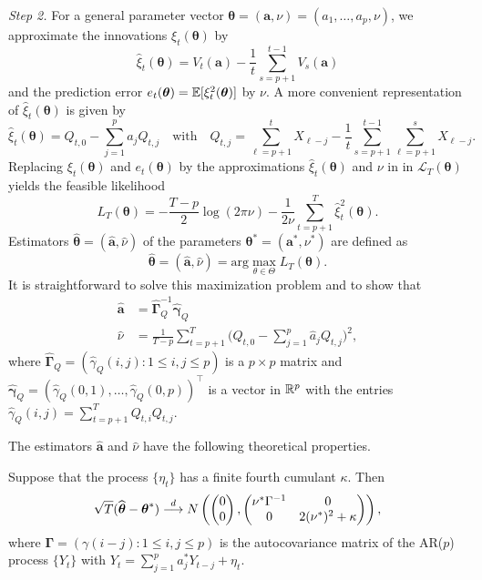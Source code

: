 \documentclass[a4paper,12pt]{article}
\begin{document}
\textit{Step 2.} For a general parameter vector $\boldsymbol{\theta} = (\boldsymbol{a},\nu) = (a_1,\ldots,a_p,\nu)$, we approximate the innovations $\xi_t(\boldsymbol{\theta})$ by 
\[ \widehat{\xi}_t(\boldsymbol{\theta}) = V_t(\boldsymbol{a}) - \frac{1}{t} \sum\limits_{s=p+1}^{t-1} V_s(\boldsymbol{a}) \]
and the prediction error $e_t(\boldsymbol{\theta}) = \mathbb{E}[ \xi_t^2(\boldsymbol{\theta})]$ by $\nu$. A more convenient representation of $\widehat{\xi}_t(\boldsymbol{\theta})$ is given by 
\[ \widehat{\xi}_t(\boldsymbol{\theta}) = Q_{t,0} - \sum\limits_{j=1}^p a_j Q_{t,j} \quad \text{with} \quad Q_{t,j} = \sum\limits_{\ell=p+1}^t X_{\ell-j} - \frac{1}{t} \sum\limits_{s=p+1}^{t-1} \sum\limits_{\ell=p+1}^s X_{\ell-j}. \]
Replacing $\xi_t(\boldsymbol{\theta})$ and $e_t(\boldsymbol{\theta})$ by the approximations $ \widehat{\xi}_t(\boldsymbol{\theta})$ and $\nu$ in in $\mathcal{L}_T(\boldsymbol{\theta})$ yields the feasible likelihood 
\[ L_T(\boldsymbol{\theta}) =  -\frac{T-p}{2} \log(2 \pi \nu) - \frac{1}{2 \nu} \sum\limits_{t=p+1}^T \widehat{\xi}_t^2(\boldsymbol{\theta}). \]
Estimators $\widehat{\boldsymbol{\theta}} = (\widehat{\boldsymbol{a}},\widehat{\nu})$ of the parameters $\boldsymbol{\theta}^* = (\boldsymbol{a}^*,\nu^*)$ are defined as
\[ \widehat{\boldsymbol{\theta}} = (\widehat{\boldsymbol{a}},\widehat{\nu}) = \text{arg} \max_{\theta \in \Theta} L_T(\boldsymbol{\theta}). \] 
It is straightforward to solve this maximization problem and to show that
\begin{align*}
\widehat{\boldsymbol{a}} & = \widehat{\boldsymbol{\Gamma}}_Q^{-1} \widehat{\boldsymbol{\gamma}}_Q \\
\widehat{\nu} & = \frac{1}{T-p} \sum\limits_{t=p+1}^T \Big( Q_{t,0} - \sum\limits_{j=1}^p \widehat{a}_j Q_{t,j} \Big)^2,
\end{align*}
where $\widehat{\boldsymbol{\Gamma}}_Q = (\widehat{\gamma}_Q(i,j): 1 \le i,j \le p)$ is a $p \times p$ matrix and $\widehat{\boldsymbol{\gamma}}_Q = (\widehat{\gamma}_Q(0,1),\ldots,\widehat{\gamma}_Q(0,p))^\top$ is a vector in $\mathbb{R}^p$ with the entries $\widehat{\gamma}_Q(i,j) = \sum_{t=p+1}^T Q_{t,i} Q_{t,j}$. 
\vspace{10pt}


The estimators $\widehat{\boldsymbol{a}}$ and $\widehat{\nu}$ have the following theoretical properties.
\begin{prop}\label{prop-ARMA}
Suppose that the process $\{ \eta_t\}$ has a finite fourth cumulant $\kappa$. Then 
\[ \sqrt{T} ( \widehat{\boldsymbol{\theta}} - \boldsymbol{\theta}^* ) \stackrel{d}{\longrightarrow} N \left( \begin{pmatrix} 0 \\ 0 \end{pmatrix}, \begin{pmatrix} \nu^* \Gamma^{-1} & 0 \\ 0 & 2 (\nu^*)^2 + \kappa \end{pmatrix} \right), \]
where $\boldsymbol{\Gamma} = (\gamma(i-j): 1 \le i,j \le p)$ is the autocovariance matrix of the AR($p$) process $\{ Y_t \}$ with $Y_t = \sum_{j=1}^p a_j^* Y_{t-j} + \eta_t$.  
\end{prop} 
\end{document}
